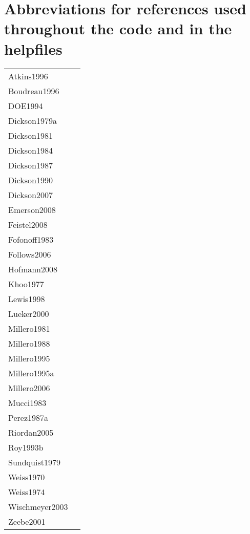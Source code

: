 \documentclass[article,nojss]{jss}
\begin{document}
\appendix

\section{Abbreviations for references used throughout the code and in the helpfiles}
\begin{tabular}{ll}
Atkins1996       & \cite{Atkins1996} \\
Boudreau1996     & \cite{Boudreau1996}\\
DOE1994          & \cite{DOE1994}\\
Dickson1979a     & \cite{Dickson1979a}\\
Dickson1981      & \cite{Dickson1981}\\
Dickson1984      & \cite{Dickson1984}\\
Dickson1987      & \cite{Dickson1987}\\
Dickson1990      & \cite{Dickson1990}\\
Dickson2007      & \cite{Dickson2007}\\
Emerson2008      & \cite{Emerson2008}\\
Feistel2008      & \cite{Feistel2008}\\
Fofonoff1983     & \cite{Fofonoff1983}\\
Follows2006      & \cite{Follows2006}\\
Hofmann2008      & \cite{Hofmann2008}\\
Khoo1977         & \cite{Khoo1977}\\
Lewis1998        & \cite{Lewis1998}\\
Lueker2000       & \cite{Lueker2000}\\
Millero1981      & \cite{Millero1981}\\
Millero1988      & \cite{Millero1988}\\
Millero1995      & \cite{Millero1995}\\
Millero1995a     & \cite{Millero1995a}\\
Millero2006      & \cite{Millero2006}\\
Mucci1983        & \cite{Mucci1983}\\
Perez1987a       & \cite{Perez1987a}\\
Riordan2005      & \cite{Riordan2005}\\
Roy1993b         & \cite{Roy1993b}\\
Sundquist1979    & \cite{Sundquist1979}\\
Weiss1970        & \cite{Weiss1970}\\
Weiss1974        & \cite{Weiss1974}\\
Wischmeyer2003   & \cite{Wischmeyer2003}\\
Zeebe2001        & \cite{Zeebe2001}\\
\end{tabular}
\end{document}
